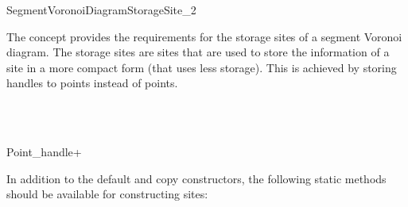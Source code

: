 


\begin{ccRefConcept}{SegmentVoronoiDiagramStorageSite_2} 


\ccDefinition

The concept  provides the
requirements for the storage sites of a segment Voronoi diagram. The
storage sites are sites that are used to store the information of a
site in a more compact form (that uses less storage). This is achieved
by storing handles to points instead of points.


\ccRefines
{}\\
\\

{Point_handle+}{}
\ccThreeToTwo
\ccTypes
{}
\ccGlue
{}



\ccCreation


In addition to the default and copy constructors, the following static
methods should be available for constructing sites:


\end{ccRefConcept}
